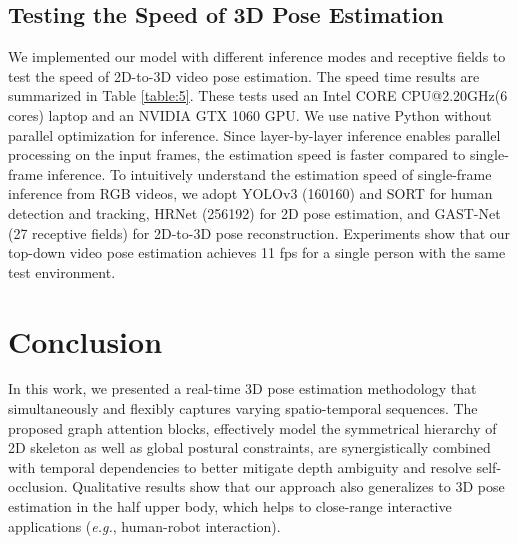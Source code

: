 \documentclass[letterpaper, 10 pt, conference, twoside]{ieeeconf}
\begin{document}
\subsection{Testing the Speed of 3D Pose Estimation}
We implemented our model with different inference modes and receptive fields to test the speed of 2D-to-3D video pose estimation. The speed time results are summarized in Table \ref{table:5}. These tests used an Intel CORE CPU@2.20GHz(6 cores) laptop and an NVIDIA GTX 1060 GPU. We use native Python without parallel optimization for inference. Since layer-by-layer inference enables parallel processing on the input frames, the estimation speed is faster compared to single-frame inference. To intuitively understand the estimation speed of single-frame inference from RGB videos, we adopt YOLOv3 (160160) \cite{redmon2018yolov3} and SORT \cite{Bewley2016_sort} for human detection and tracking, HRNet (256192) \cite{sun2019deep} for 2D pose estimation, and GAST-Net (27 receptive fields) for 2D-to-3D pose reconstruction. Experiments show that our top-down video pose estimation achieves 11 fps for a single person with the same test environment.



\section{Conclusion}
In this work, we presented a real-time 3D pose estimation methodology that simultaneously and flexibly captures varying spatio-temporal sequences. The proposed graph attention blocks, effectively model the symmetrical hierarchy of 2D skeleton as well as global postural constraints, are synergistically combined with temporal dependencies to better mitigate depth ambiguity and resolve self-occlusion. Qualitative results show that our approach also generalizes to 3D pose estimation in the half upper body, which helps to close-range interactive applications (\emph{e.g.}, human-robot interaction).


\end{document}
